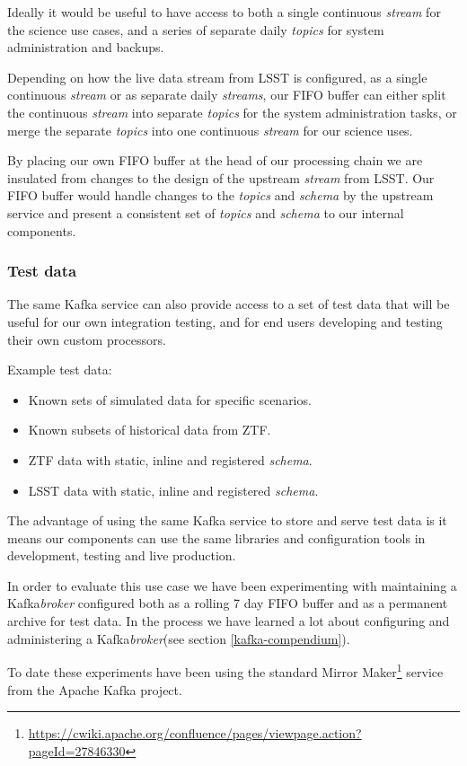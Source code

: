 \documentclass{article}
\newcommand{\kafka} {Kafka\xspace}
\newcommand{\kftopics} {\textit{topics}\xspace}
\newcommand{\kfstream} {\textit{stream}\xspace}
\newcommand{\kfstreams} {\textit{streams}\xspace}
\newcommand{\kfbroker} {\textit{broker}\xspace}
\newcommand{\apache} {Apache\xspace}
\newcommand{\fifo} {FIFO\xspace}
\newcommand{\avschema} {\textit{schema}\xspace}
\newcommand{\mirrormaker} {Mirror Maker\xspace}
\newcommand{\ztf} {ZTF\xspace}
\newcommand{\lsst} {LSST\xspace}
\newcommand{\footurl}[1] {\footnote{\url{#1}}}
\begin{document}
Ideally it would be useful to have access to both a single continuous \kfstream for the science use cases, and a series of separate daily \kftopics for system administration and backups.

Depending on how the live data stream from \lsst is configured, as a single continuous \kfstream or as separate daily \kfstreams, our \fifo buffer can either split the continuous \kfstream into separate \kftopics for the system administration tasks, or merge the separate \kftopics into one continuous \kfstream for our science uses.

By placing our own \fifo buffer at the head of our processing chain we are insulated from changes to the design of the upstream \kfstream from \lsst.
Our \fifo buffer would handle changes to the \kftopics and \avschema by the upstream service and present a consistent set of \kftopics and \avschema to our internal components.

\subsubsection{Test data}
\label{stage-1.test-data}
The same \kafka service can also provide access to a set of test data that will be useful for our own integration testing, and for end users developing and testing their own custom processors.

Example test data:
\begin{itemize}
  \item Known sets of simulated data for specific scenarios.
  \item Known subsets of historical data from \ztf.
  \item \ztf data with static, inline and registered \avschema.
  \item \lsst data with static, inline and registered \avschema.
\end{itemize}

The advantage of using the same \kafka service to store and serve test data is it means our components can use the same libraries and configuration tools in development, testing and live production.

In order to evaluate this use case we have been experimenting with maintaining a \kafka \kfbroker configured both as a rolling 7 day \fifo buffer and as a permanent archive for test data.
In the process we have learned a lot about configuring and administering a \kafka \kfbroker (see section \ref{kafka-compendium}).

To date these experiments have been using the standard \mirrormaker\footurl{https://cwiki.apache.org/confluence/pages/viewpage.action?pageId=27846330} service from the \apache \kafka project.
\end{document}
